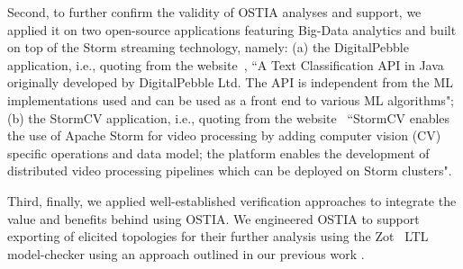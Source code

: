 Second, to further confirm the validity of OSTIA analyses and support, we
applied it on two open-source applications featuring Big-Data analytics and
built on top of the Storm streaming technology, namely: (a) the DigitalPebble
application, i.e., quoting from the
website~\cite{storm-crawler},
``A Text Classification API in Java originally developed by DigitalPebble Ltd. The
API is independent from the ML implementations used and can be used as a front
end to various ML algorithms"; (b) the StormCV application, i.e., quoting from
the website~\cite{stormCV}
``StormCV
enables the use of Apache Storm for video processing by adding computer vision
(CV) specific operations and data model; the platform enables the development of
distributed video processing pipelines which can be deployed on Storm clusters".

Third, finally, we applied well-established verification approaches to integrate
the value and benefits behind using OSTIA. We engineered OSTIA to support
exporting of elicited topologies for their further analysis using the
Zot~\cite{zot}
LTL model-checker using an
approach outlined in our previous work \cite{icsoft,BRS15}.

